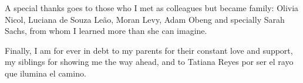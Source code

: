 A special thanks goes to those who I met as colleagues but became family: Olivia Nicol, Luciana de Souza Leão, Moran Levy, Adam Obeng and specially Sarah Sachs, from whom I learned more than she can imagine.

Finally, I am for ever in debt to my parents for their constant love and support, my siblings for showing me the way ahead, and to Tatiana Reyes por ser el rayo que ilumina el camino.
